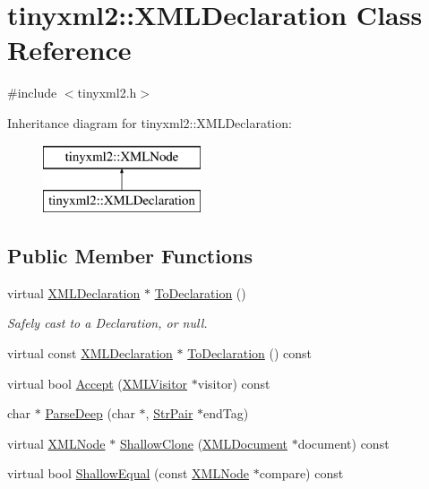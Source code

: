 \hypertarget{classtinyxml2_1_1_x_m_l_declaration}{\section{tinyxml2\-:\-:X\-M\-L\-Declaration Class Reference}
\label{classtinyxml2_1_1_x_m_l_declaration}
}


{\ttfamily \#include $<$tinyxml2.\-h$>$}

Inheritance diagram for tinyxml2\-:\-:X\-M\-L\-Declaration\-:\begin{figure}[H]
\begin{center}
\leavevmode
\includegraphics[height=2.000000cm]{classtinyxml2_1_1_x_m_l_declaration}
\end{center}
\end{figure}
\subsection*{Public Member Functions}
\begin{DoxyCompactItemize}
\item 
virtual \hyperlink{classtinyxml2_1_1_x_m_l_declaration}{X\-M\-L\-Declaration} $\ast$ \hyperlink{classtinyxml2_1_1_x_m_l_declaration_a159d8ac45865215e88059ea1e5b52fc5}{To\-Declaration} ()
\begin{DoxyCompactList}\small\item\em Safely cast to a Declaration, or null. \end{DoxyCompactList}\item 
virtual const \hyperlink{classtinyxml2_1_1_x_m_l_declaration}{X\-M\-L\-Declaration} $\ast$ \hyperlink{classtinyxml2_1_1_x_m_l_declaration_af724607a5fa810496fd6a21f5975a643}{To\-Declaration} () const 
\item 
virtual bool \hyperlink{classtinyxml2_1_1_x_m_l_declaration_a953a7359cc312d15218eb5843a4ca108}{Accept} (\hyperlink{classtinyxml2_1_1_x_m_l_visitor}{X\-M\-L\-Visitor} $\ast$visitor) const 
\item 
char $\ast$ \hyperlink{classtinyxml2_1_1_x_m_l_declaration_a19e33e0a9f9500f449261558c36f9a44}{Parse\-Deep} (char $\ast$, \hyperlink{classtinyxml2_1_1_str_pair}{Str\-Pair} $\ast$end\-Tag)
\item 
virtual \hyperlink{classtinyxml2_1_1_x_m_l_node}{X\-M\-L\-Node} $\ast$ \hyperlink{classtinyxml2_1_1_x_m_l_declaration_a39458732ee6796cfc85dd35d3c488e0b}{Shallow\-Clone} (\hyperlink{classtinyxml2_1_1_x_m_l_document}{X\-M\-L\-Document} $\ast$document) const 
\item 
virtual bool \hyperlink{classtinyxml2_1_1_x_m_l_declaration_ace0d2d9bc1b63278bd5e984ebe0c7bd0}{Shallow\-Equal} (const \hyperlink{classtinyxml2_1_1_x_m_l_node}{X\-M\-L\-Node} $\ast$compare) const 
\end{DoxyCompactItemize}
